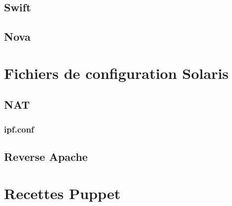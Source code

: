 \documentclass[a4paper,oneside]{report}
\begin{document}
\section{Swift}

\section{Nova}

\chapter{Fichiers de configuration Solaris}
\section{NAT}
\subsection{ipf.conf} \label{conf:NAT}
\section{Reverse Apache} \label{conf:apacheProxy}

\chapter{Recettes Puppet}

\nocite{*}
\printbibliography

\printglossaries
\end{document}
